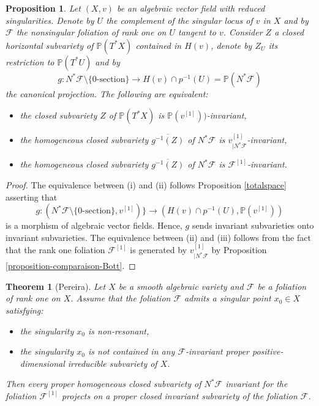 \documentclass[12pt]{amsart}
\renewcommand{\P}{\mathbb{P}}
\theoremstyle{definition}
\theoremstyle{plain}
\newtheorem{proposition}[definition]{Proposition}
\newtheorem{theorem}[definition]{Theorem}
\theoremstyle{exampstyle}
\theoremstyle{exampstyle}\newtheorem{thmxbis}{Theorem}
\numberwithin{equation}{section}
\theoremstyle{remark}
\begin{document}
\begin{proposition}\label{proposition-translation-Pereira}
Let $(X,v)$ be an algebraic vector field with reduced singularities. Denote by $U$ the complement of the singular locus of $v$ in $X$ and by $\mathcal F$ the nonsingular foliation of rank one on $U$ tangent to $v$. Consider $Z$ a closed horizontal subvariety of $\P(T^\ast X)$ contained in $H(v)$, denote by $Z_U$ its restriction to $\P(T^\ast U)$ and by $$g : N^\ast \mathcal F \setminus \lbrace 0\text{-section} \rbrace \rightarrow H(v) \cap p^{-1}(U) = \P(N^\ast \mathcal F)$$
the canonical projection. The following are equivalent: 
\begin{itemize} 
\item[(i)] the closed subvariety $Z$ of $\P(T^\ast X)$   is  $\P(v^{[1]}))$-{\em invariant},
\item[(ii)] the  homogeneous closed subvariety $\overline{g^{-1}(Z)}$ of $N^\ast \mathcal F$ is $v^{[1]}_{\mid N^\ast \mathcal F}$-{\em invariant}, 
\item[(iii)] the  homogeneous closed subvariety  $\overline{g^{-1}(Z)}$ of $N^\ast \mathcal F$ is $\mathcal F^{[1]}$-{\em invariant}.
\end{itemize} 
\end{proposition} 

\begin{proof} 
The equivalence between (i) and (ii) follows Proposition \ref{totalspace} asserting that
$$g : (N^\ast \mathcal F \setminus \lbrace 0\text{-section} \rbrace, v^{[1]}) \rbrace \rightarrow (H(v) \cap p^{-1}(U), \P(v^{[1]}))$$
is a morphism of algebraic vector fields. Hence, $g$ sends invariant subvarieties onto invariant subvarieties. The equivalence between (ii) and (iii) follows from the fact that the rank one foliation
$\mathcal F^{[1]}$ is generated by $v^{[1]}_{\mid N^\ast \mathcal F}$ by Proposition \ref{proposition-comparaison-Bott}.
\end{proof} 


\begin{theorem}[Pereira]\label{theorem-Pereira}
Let $X$ be a smooth algebraic variety and $\mathcal F$ be a foliation of rank one on $X$.  Assume that the foliation $\mathcal F$ admits a singular point $x_0 \in X$ satisfying:
\begin{itemize}
\item[(a)] the singularity $x_0$ is non-resonant, 
\item[(b)] the singularity $x_0$ is not contained in any $\mathcal F$-invariant proper positive-dimensional irreducible subvariety of $X$.
\end{itemize}
Then every {\em proper} homogeneous closed subvariety  of $N^\ast \mathcal F$ invariant for the foliation $\mathcal F^{[1]}$ projects on a {\em proper} closed invariant subvariety of the foliation $\mathcal F$.
\end{theorem} 
\end{document}
